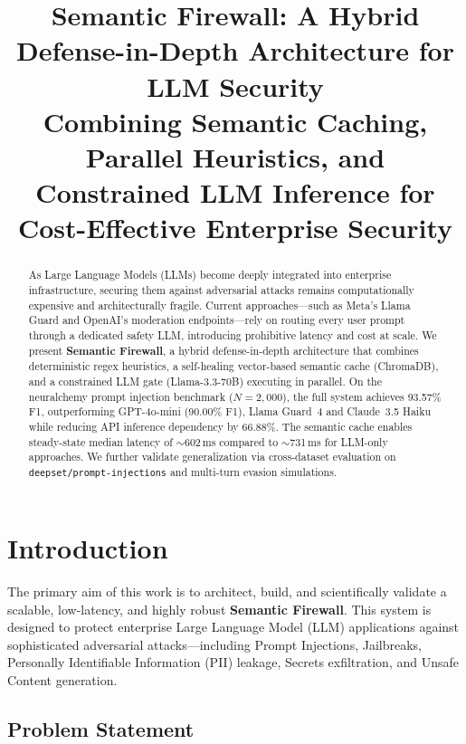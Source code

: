 \documentclass[12pt,a4paper]{article}
\title{
    \textbf{Semantic Firewall: A Hybrid Defense-in-Depth Architecture for LLM Security} \\[0.5em]
    \large Combining Semantic Caching, Parallel Heuristics, and Constrained LLM Inference for Cost-Effective Enterprise Security
}
\author{}
\date{}
\begin{document}
\maketitle
\thispagestyle{empty}

\begin{abstract}
As Large Language Models (LLMs) become deeply integrated into enterprise infrastructure, securing them against adversarial attacks remains computationally expensive and architecturally fragile. Current approaches---such as Meta's Llama Guard and OpenAI's moderation endpoints---rely on routing every user prompt through a dedicated safety LLM, introducing prohibitive latency and cost at scale. We present \textbf{Semantic Firewall}, a hybrid defense-in-depth architecture that combines deterministic regex heuristics, a self-healing vector-based semantic cache (ChromaDB), and a constrained LLM gate (Llama-3.3-70B) executing in parallel. On the neuralchemy prompt injection benchmark ($N{=}2{,}000$), the full system achieves 93.57\% F1, outperforming GPT-4o-mini (90.00\% F1), Llama Guard~4 and Claude~3.5 Haiku while reducing API inference dependency by 66.88\%. The semantic cache enables steady-state median latency of $\sim$602\,ms compared to $\sim$731\,ms for LLM-only approaches. We further validate generalization via cross-dataset evaluation on \texttt{deepset/prompt-injections} and multi-turn evasion simulations.
\end{abstract}

\tableofcontents
\newpage

\section{Introduction}

The primary aim of this work is to architect, build, and scientifically validate a scalable, low-latency, and highly robust \textbf{Semantic Firewall}. This system is designed to protect enterprise Large Language Model (LLM) applications against sophisticated adversarial attacks---including Prompt Injections, Jailbreaks, Personally Identifiable Information (PII) leakage, Secrets exfiltration, and Unsafe Content generation.

\subsection{Problem Statement}
\end{document}
